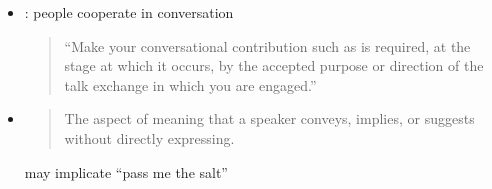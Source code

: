 \documentclass[headrule,footrule]{foils}
\begin{document}
\begin{itemize}
\item {}: people cooperate in conversation
  \begin{quote}
    ``Make your conversational contribution such as is required, at the stage at which it occurs, by the accepted purpose or direction of the talk exchange in which you are engaged.''
  \end{quote}
\item {}
  \begin{quote}
    The aspect of meaning that a speaker conveys, implies, or suggests
    without directly expressing.
  \end{quote}
  may implicate ``pass me the salt''
\end{itemize}
\end{document}
